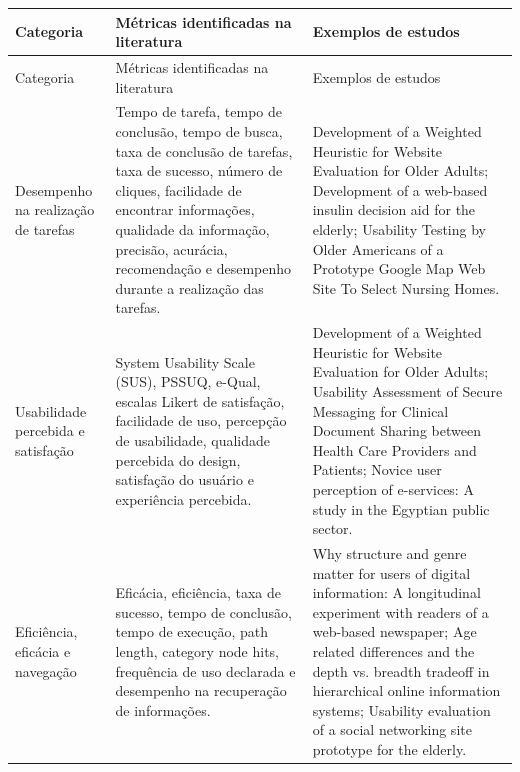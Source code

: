 \begin{longtable}{|p{3.5cm}|p{5.5cm}|p{6cm}|}

\hline

Categoria & Métricas identificadas na literatura & Exemplos de estudos \\ \hline

\endfirsthead

\hline

Categoria & Métricas identificadas na literatura & Exemplos de estudos \\ \hline

\endhead

\hline

\endfoot

\endlastfoot

Desempenho na realização de tarefas &

Tempo de tarefa, tempo de conclusão, tempo de busca, taxa de conclusão de tarefas, taxa de sucesso, número de cliques, facilidade de encontrar informações, qualidade da informação, precisão, acurácia, recomendação e desempenho durante a realização das tarefas. &

Development of a Weighted Heuristic for Website Evaluation for Older Adults; Development of a web-based insulin decision aid for the elderly; Usability Testing by Older Americans of a Prototype Google Map Web Site To Select Nursing Homes. \\ \hline

Usabilidade percebida e satisfação &

System Usability Scale (SUS), PSSUQ, e-Qual, escalas Likert de satisfação, facilidade de uso, percepção de usabilidade, qualidade percebida do design, satisfação do usuário e experiência percebida. &

Development of a Weighted Heuristic for Website Evaluation for Older Adults; Usability Assessment of Secure Messaging for Clinical Document Sharing between Health Care Providers and Patients; Novice user perception of e-services: A study in the Egyptian public sector. \\ \hline

Eficiência, eficácia e navegação &

Eficácia, eficiência, taxa de sucesso, tempo de conclusão, tempo de execução, path length, category node hits, frequência de uso declarada e desempenho na recuperação de informações. &

Why structure and genre matter for users of digital information: A longitudinal experiment with readers of a web-based newspaper; Age related differences and the depth vs. breadth tradeoff in hierarchical online information systems; Usability evaluation of a social networking site prototype for the elderly. \\ \hline


\end{longtable}
